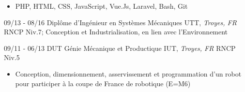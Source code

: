 \documentclass[]{friggeri-cv}
\begin{document}
\vspace*{-0.35cm}
\begin{itemize}
\setlength{\itemsep}{1pt}
\setlength{\parskip}{0pt}
\setlength{\parsep}{0pt}

\item PHP, HTML, CSS, JavaScript, Vue.Js, Laravel, Bash, Git
\end{itemize}\vspace{0.5mm}
\begin{entrylist}
  \entry
    {09/13 - 08/16}
    {Diplôme d'Ingénieur en Systèmes Mécaniques}
    {UTT, \textit{Troyes, FR}}
    {RNCP Niv.7; Conception et Industrialisation, en lien avec l’Environnement}
\end{entrylist}
\vspace{0.5mm}
\begin{entrylist}
  \entry
    {09/11 - 06/13}
    {DUT Génie Mécanique et Productique}
    {IUT, \textit{Troyes, FR}}
    {RNCP Niv.5}
\end{entrylist}
\vspace*{-0.4cm}
\begin{itemize}
\setlength{\itemsep}{1pt}
\setlength{\parskip}{0pt}
\setlength{\parsep}{0pt}
\item Conception, dimensionnement, asservissement et programmation d’un robot pour participer à la coupe de France de robotique (E=M6)
\end{itemize}
\end{document}
